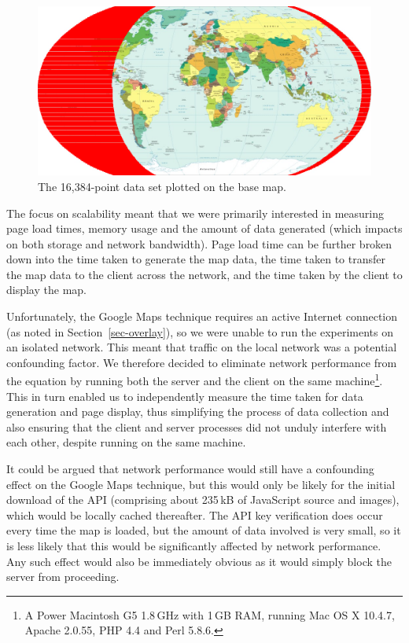 \documentclass[acmnow]{acmtrans2m}
\begin{document}
\begin{figure}
	\centering
	\includegraphics[width=\textwidth,keepaspectratio]{16384_points}
	\caption{The 16,384-point data set plotted on the base map.}
	\label{fig-grid-points}
\end{figure}


The focus on scalability meant that we were primarily interested in
measuring page load times, memory usage and the amount of data
generated (which impacts on both storage and network bandwidth). Page
load time can be further broken down into the time taken to generate the
map data, the time taken to transfer the map data to the client across
the network, and the time taken by the client to display the map.

Unfortunately, the Google Maps technique requires an active Internet
connection (as noted in Section~\ref{sec-overlay}), so we were unable to
run the experiments on an isolated network. This meant that traffic on
the local network was a potential confounding factor. We therefore
decided to eliminate network performance from the equation by running
both the server and the client on the same machine\footnote{A Power
Macintosh G5 1.8\,GHz with 1\,GB RAM, running Mac OS X 10.4.7, Apache
2.0.55, PHP 4.4 and Perl 5.8.6.}. This in turn enabled us to
independently measure the time taken for data generation and page
display, thus simplifying the process of data collection and also
ensuring that the client and server processes did not unduly interfere
with each other, despite running on the same machine.

It could be argued that network performance would still have a
confounding effect on the Google Maps technique, but this would only be
likely for the initial download of the API (comprising about 235\,kB of
JavaScript source and images), which would be locally cached thereafter.
The API key verification does occur every time the map is loaded, but
the amount of data involved is very small, so it is less likely that
this would be significantly affected by network performance. Any such
effect would also be immediately obvious as it would simply block the
server from proceeding.
\end{document}
